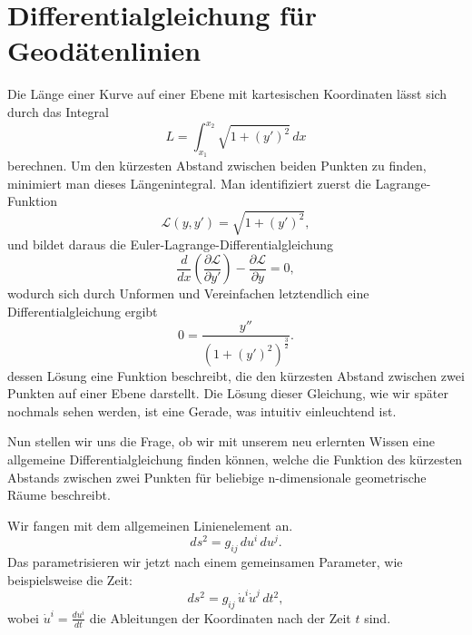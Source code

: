 %
%
%
%
\section{Differentialgleichung für Geodätenlinien
\label{geodaeten:section:Standardverfahren}}

Die Länge einer Kurve auf einer Ebene mit kartesischen Koordinaten lässt sich durch das Integral
\begin{equation}
	L = \int_{x_1}^{x_2} \sqrt{1 + \left(y'\right)^2} \, dx
\end{equation}
berechnen.
Um den kürzesten Abstand zwischen beiden Punkten zu finden, minimiert man dieses Längenintegral.
Man identifiziert zuerst die Lagrange-Funktion
\begin{equation}
	\mathcal{L}(y, y') = \sqrt{1 + \left(y'\right)^2},
\end{equation}
und bildet daraus die Euler-Lagrange-Differentialgleichung
\begin{equation}
	\frac{d}{dx} \left(\frac{\partial \mathcal{L}}{\partial y'}\right) - \frac{\partial \mathcal{L}}{\partial y} = 0,
\end{equation}
wodurch sich durch Unformen und Vereinfachen letztendlich eine Differentialgleichung ergibt
\begin{equation}
	0 = \frac{y''}{\left(1 + \left(y'\right)^2\right)^{\frac{3}{2}}}.
\end{equation}
dessen Lösung eine Funktion beschreibt, die den kürzesten Abstand zwischen zwei Punkten auf einer Ebene darstellt. Die Lösung dieser Gleichung, wie wir später nochmals sehen werden, ist eine Gerade, was intuitiv einleuchtend ist.

Nun stellen wir uns die Frage, ob wir mit unserem neu erlernten Wissen eine allgemeine Differentialgleichung finden können, welche die Funktion des kürzesten Abstands zwischen zwei Punkten für beliebige n-dimensionale geometrische Räume beschreibt.

Wir fangen mit dem allgemeinen Linienelement an.
\begin{equation}
	ds^2 = g_{ij} \, du^i \, du^j.
\end{equation}
Das parametrisieren wir jetzt nach einem gemeinsamen Parameter, wie beispielsweise die Zeit:
\begin{equation}
	ds^2 = g_{ij} \, \dot{u}^i \dot{u}^j \, dt^2,
\end{equation}
wobei $\dot{u}^i = \frac{du^i}{dt}$ die Ableitungen der Koordinaten nach der Zeit $t$ sind.

